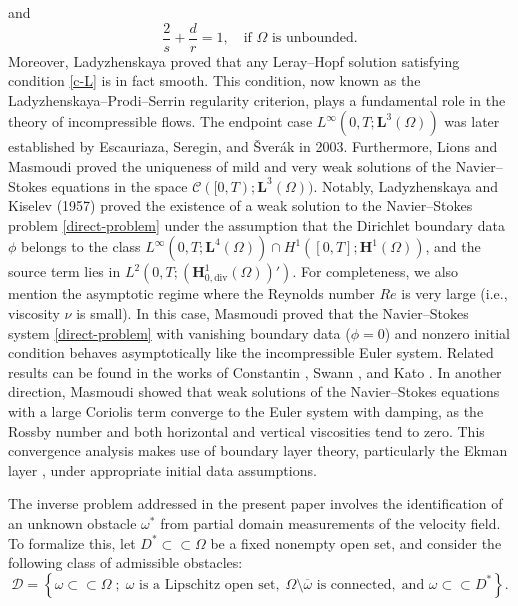 \documentclass[a4paper,12pt,reqno,natbib]{amsart}
\def\H{\textbf{H}}
\def\L{\textbf{L}}
\begin{document}
and
\begin{equation*}
    \frac{2}{s} + \frac{d}{r} = 1, \quad \text{if } \Omega \text{ is unbounded.}
\end{equation*}
Moreover, Ladyzhenskaya \cite{ladyzhenskaya1969uniqueness} proved that any Leray--Hopf solution satisfying condition \eqref{c-L} is in fact smooth. This condition, now known as the Ladyzhenskaya--Prodi--Serrin regularity criterion, plays a fundamental role in the theory of incompressible flows. The endpoint case \( L^{\infty}(0, T ; \L^3(\Omega)) \) was later established by Escauriaza, Seregin, and {\v{S}}ver\'ak \cite{escauriaza2003l3} in 2003.  Furthermore, Lions and Masmoudi \cite{lions2001uniqueness} proved the uniqueness of mild and very weak solutions of the Navier--Stokes equations in the space \( \mathcal{C}([0,T); \L^3(\Omega)) \). Notably, Ladyzhenskaya and Kiselev (1957) \cite{olga1963} proved the existence of a weak solution to the Navier--Stokes problem \eqref{direct-problem} under the assumption that the Dirichlet boundary data $\phi$ belongs to the class \( L^{\infty}(0, T ; \L^4(\Omega)) \cap H^1([0,T];\H^1(\Omega)) \), and the source term lies in \( L^2(0,T; (\H^1_{0,\text{div}}(\Omega))') \). For completeness, we also mention the asymptotic regime where the Reynolds number \( Re \) is very large (i.e., viscosity \( \nu \) is small). In this case, Masmoudi \cite{masmoudi2007remarks} proved that the Navier--Stokes system \eqref{direct-problem} with vanishing boundary data (\( \phi = 0 \)) and nonzero initial condition behaves asymptotically like the incompressible Euler system. Related results can be found in the works of Constantin \cite{Constantin1986}, Swann \cite{swann1971convergence}, and Kato \cite{kato1972nonstationary}. In another direction, Masmoudi \cite{masmoudi1998euler} showed that weak solutions of the Navier--Stokes equations with a large Coriolis term converge to the Euler system with damping, as the Rossby number and both horizontal and vertical viscosities tend to zero. This convergence analysis makes use of boundary layer theory, particularly the Ekman layer \cite{ekman1905influence}, under appropriate initial data assumptions.





\medskip

The inverse problem addressed in the present paper involves the identification of an unknown obstacle \( \omega^* \) from partial domain measurements of the velocity field. To formalize this, let \( D^* \subset\subset \Omega \) be a fixed nonempty open set, and consider the following class of admissible obstacles:
\[
\mathcal{D} = \left\{ \omega \subset\subset \Omega \; ; \; \omega \text{ is a Lipschitz open set},\; \Omega \setminus \overline{\omega} \text{ is connected},\; \text{and } \omega \subset\subset D^* \right\}.
\]
\end{document}

